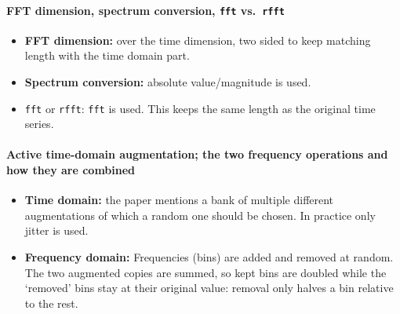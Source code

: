 \documentclass[a4paper,11pt]{article}
\newcommand{\code}[1]{\texttt{#1}}
\begin{document}
\paragraph{FFT dimension, spectrum conversion, \code{fft} vs.\ \code{rfft}}
\begin{itemize}
\item \textbf{FFT dimension:} over the time dimension, two sided to keep matching length with the time domain part.
\item \textbf{Spectrum conversion:} absolute value/magnitude is used.
\item \code{fft} or \code{rfft}: \code{fft} is used. This keeps the same length as the original time series.
\end{itemize}

\paragraph{Active time-domain augmentation; the two frequency operations and how they are combined}
\begin{itemize}
\item \textbf{Time domain:} the paper mentions a bank of multiple different augmentations of which a random one should be chosen. In practice only jitter is used.
\item \textbf{Frequency domain:} Frequencies (bins) are added and removed at random. The two augmented copies are summed, so kept bins are doubled while the `removed' bins stay at their original value: removal only halves a bin relative to the rest.
\end{itemize}
\end{document}
